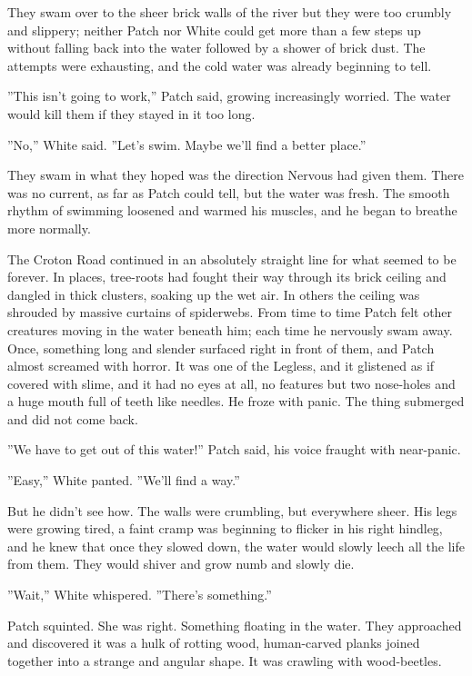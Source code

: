 \documentclass[12pt]{book}
\begin{document}
They swam over to the sheer brick walls of the river %
but they were too crumbly and slippery; neither Patch nor White could get more than a few steps up without falling back into the water followed by a shower of brick dust. The attempts were exhausting, and the cold water was already beginning to tell.

''This isn't going to work,'' Patch said, growing increasingly worried. The water would kill them if they stayed in it too long.

''No,'' White said. ''Let's swim. Maybe we'll find a better place.''

They swam in what they hoped was the direction Nervous had given them. There was no current, as far as Patch could tell, but the water was fresh. The smooth rhythm of swimming loosened and warmed his muscles, and he began to breathe more normally.

The Croton Road continued in an absolutely straight line for what seemed to be forever. In places, tree-roots had fought their way through its brick ceiling and dangled in thick clusters, soaking up the wet air. In others the ceiling was shrouded by massive curtains of spiderwebs. From time to time Patch felt other creatures moving in the water beneath him; each time he nervously swam away. Once, something long and slender surfaced right in front of them, and Patch almost screamed with horror. It was one of the Legless, and it glistened as if covered with slime, and it had no eyes at all, no features but two nose-holes and a huge mouth full of teeth like needles. He froze with panic. The thing submerged and did not come back.

''We have to get out of this water!'' Patch said, his voice fraught with near-panic.

''Easy,'' White panted. ''We'll find a way.''

But he didn't see how. The walls were crumbling, but everywhere sheer. His legs were growing tired, a faint cramp was beginning to flicker in his right hindleg, and he knew that once they slowed down, the water would slowly leech all the life from them. They would shiver and grow numb and slowly die.

''Wait,'' White whispered. ''There's something.''

Patch squinted. She was right. Something floating in the water. They approached and discovered it was a hulk of rotting wood, human-carved planks joined together into a strange and angular shape. It was crawling with wood-beetles.
\end{document}
